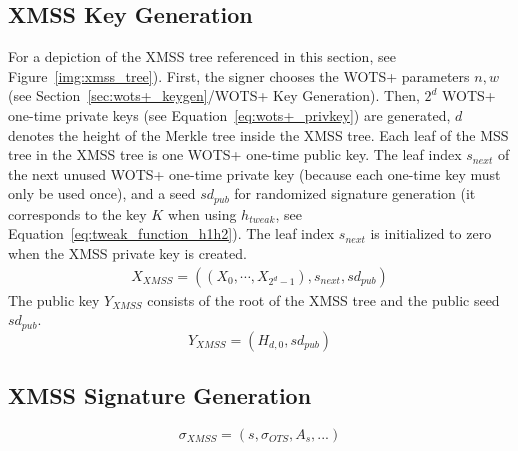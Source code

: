 \subsection{XMSS Key Generation}
For a depiction of the XMSS tree referenced in this section, see Figure~\ref{img:xmss_tree}). %
First, the signer chooses the WOTS+ parameters $n, w$ (see Section~\ref{sec:wots+_keygen}/WOTS+ Key Generation).
Then, $2^d$ WOTS+ one-time private keys (see Equation~\ref{eq:wots+_privkey}) are generated, $d$ denotes the height of the Merkle tree inside the XMSS tree. %
Each leaf of the MSS tree in the XMSS tree is one WOTS+ one-time public key. 
The leaf index $s_{next}$ of the next unused WOTS+ one-time private key (because each one-time key must only be used once), and a seed $sd_{pub}$ for randomized signature generation (it corresponds to the key $K$ when using $h_{tweak}$, see Equation~\ref{eq:tweak_function_h1h2}). The leaf index $s_{next}$ is initialized to zero when the XMSS private key is created.
\begin{align}
\label{eq:xmss_priv_key}
X_{XMSS} = ((X_0, \cdots, X_{2^d-1}), s_{next}, sd_{pub})
\end{align}
The public key $Y_{XMSS}$ consists of the root of the XMSS tree and the public seed $sd_{pub}$.
\begin{equation}
\label{eq:xmss_pubkey}
Y_{XMSS} = (H_{d,0}, sd_{pub})
\end{equation}

\subsection{XMSS Signature Generation}

\begin{equation}
\label{eq:xmss_sign}
\sigma_{XMSS} = (s, \sigma_{OTS}, A_s, ...) 
\end{equation}

